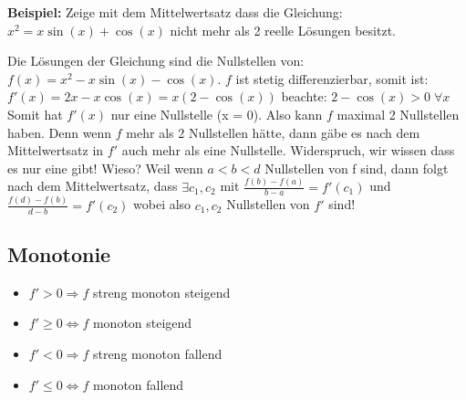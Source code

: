 {\small
\textbf{Beispiel:} 
Zeige mit dem Mittelwertsatz dass die Gleichung:\\
$x^2 = x \sin(x) + \cos(x)$ nicht mehr als 2 reelle Lösungen besitzt.

Die Lösungen der Gleichung sind die Nullstellen von:\\ $f(x) = x^2 - x \sin(x) - \cos(x)$. 
$f$ ist stetig differenzierbar, somit ist:\\ $f'(x) = 2x - x \cos(x) = x(2 - \cos(x))$ \hspace{0.4cm} beachte: $2 - \cos(x) > 0 \; \forall x$\\
Somit hat $f'(x)$ nur eine Nullstelle (x = 0). Also kann $f$ maximal 2 Nullstellen haben. Denn wenn $f$ mehr als 2 Nullstellen hätte, dann gäbe es nach dem Mittelwertsatz in $f'$ auch mehr als eine Nullstelle. Widerspruch, wir wissen dass es nur eine gibt! Wieso? Weil wenn $a < b < d$ Nullstellen von f sind, dann folgt nach dem Mittelwertsatz, dass $\exists c_1, c_2$ mit $\frac{f(b) - f(a)}{b-a} = f'(c_1)$ und $\frac{f(d) - f(b)}{d-b} = f'(c_2)$ wobei also $c_1, c_2$ Nullstellen von $f'$ sind!
}


\subsection{Monotonie}
\begin{itemize}
	\item $f' > 0 \Rightarrow f$ streng monoton steigend
	\item $f' \geq 0 \Leftrightarrow f$ monoton steigend
	\item $f' < 0 \Rightarrow f$ streng monoton fallend
	\item $f' \leq 0 \Leftrightarrow f$ monoton fallend
\end{itemize}

